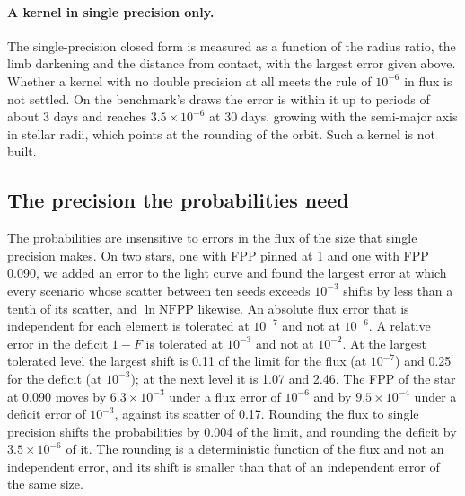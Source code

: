 \documentclass[11pt]{article}
\begin{document}
\paragraph{A kernel in single precision only.} The single-precision closed form is measured as a function of the radius ratio, the limb darkening and the distance from contact, with the largest error given above. Whether a kernel with no double precision at all meets the rule of $10^{-6}$ in flux is not settled. On the benchmark's draws the error is within it up to periods of about 3 days and reaches $3.5\times10^{-6}$ at 30 days, growing with the semi-major axis in stellar radii, which points at the rounding of the orbit. Such a kernel is not built.


\subsection{The precision the probabilities need}\label{sec:precision}

The probabilities are insensitive to errors in the flux of the size that single precision makes. On two stars, one with FPP pinned at 1 and one with FPP 0.090, we added an error to the light curve and found the largest error at which every scenario whose scatter between ten seeds exceeds $10^{-3}$ shifts by less than a tenth of its scatter, and $\ln\mathrm{NFPP}$ likewise. An absolute flux error that is independent for each element is tolerated at $10^{-7}$ and not at $10^{-6}$. A relative error in the deficit $1-F$ is tolerated at $10^{-3}$ and not at $10^{-2}$. At the largest tolerated level the largest shift is 0.11 of the limit for the flux (at $10^{-7}$) and 0.25 for the deficit (at $10^{-3}$); at the next level it is 1.07 and 2.46. The FPP of the star at 0.090 moves by $6.3\times10^{-3}$ under a flux error of $10^{-6}$ and by $9.5\times10^{-4}$ under a deficit error of $10^{-3}$, against its scatter of 0.17. Rounding the flux to single precision shifts the probabilities by 0.004 of the limit, and rounding the deficit by $3.5\times10^{-6}$ of it. The rounding is a deterministic function of the flux and not an independent error, and its shift is smaller than that of an independent error of the same size.
\end{document}
